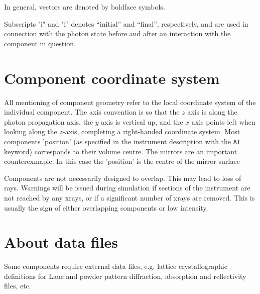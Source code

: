 In general, vectors are denoted by boldface symbols.

Subscripts "i" and "f" denotes ``initial'' and ``final'', respectively,
and are used in connection with the photon state before and after
an interaction with the component in question.


\section{Component coordinate system}
All mentioning of component geometry refer to
the local coordinate system of the individual component.
The axis convention is so that the $z$ axis is along
the photon propagation axis, the $y$ axis is vertical up,
and the $x$ axis points left when looking along the $z$-axis,
completing a right-handed coordinate system.
Most components 'position' (as specified in the instrument description
with the \verb+AT+ keyword) corresponds to their volume centre. The mirrors
are an important counterexmaple. In this case the 'position' is the
centre of the mirror surface

Components are not necessarily designed to overlap.
This may lead to loss of rays.
Warnings will be issued during simulation if sections of the instrument
are not reached by any xrays, or if a significant number of xrays are removed.
This is usually the sign of either overlapping components
or low intensity.

\section{About data files}
Some components require external data files,
e.g. lattice crystallographic definitions for Laue and powder pattern diffraction,
absorption and reflectivity files, etc.

